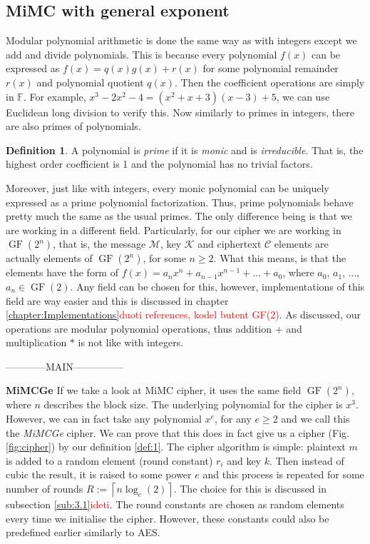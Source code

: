 \documentclass{Resources/UoBLab1}
\theoremstyle{definition}
\newtheorem{definition}[theorem]{Definition}
\begin{document}
\subsection{MiMC with general exponent}
Modular polynomial arithmetic is done the same way as with integers except we add and divide polynomials. This is because every polynomial $f(x)$ can be expressed as $f(x) = q(x)g(x) + r(x)$ for some polynomial remainder $r(x)$ and polynomial quotient $q(x)$. Then the coefficient operations are simply in $\mathbb{F}$. For example, \(x^3-2x^2-4 = (x^2+x+3)(x-3) + 5\), we can use Euclidean long division to verify this. Now similarly to primes in integers, there are also primes of polynomials.
\begin{definition}
    A polynomial is \textit{prime} if it is \textit{monic} and is \textit{irreducible}. That is, the highest order coefficient is 1 and the polynomial has no trivial factors.
\end{definition}
Moreover, just like with integers, every monic polynomial can be uniquely expressed as a prime polynomial factorization. Thus, prime polynomials behave pretty much the same as the usual primes. The only difference being is that we are working in a different field. Particularly, for our cipher we are working in $\operatorname{GF}(2^n)$, that is, the message $\mathcal{M}$, key $\mathcal{K}$ and ciphertext $\mathcal{C}$ elements are actually elements of $\operatorname{GF}(2^n)$, for some $n \ge 2$. What this means, is that the elements have the form of $f(x) = a_nx^n + a_{n-1}x^{n-1} + ... + a_0$, where $a_0$, $a_1$, ..., $a_n \in \operatorname{GF}(2)$. Any field can be chosen for this, however, implementations of this field are way easier and this is discussed in chapter \ref{chapter:Implementations}\textcolor{red}{duoti references, kodel butent GF(2)}. As discussed, our operations are modular polynomial operations, thus addition $+$ and multiplication $*$ is not like with integers.\medskip

------------MAIN---------------

\noindent\textbf{MiMCGe} If we take a look at MiMC cipher\cite{MiMC}, it uses the same field $\operatorname{GF}(2^n)$, where $n$ describes the block size. The underlying polynomial for the cipher is $x^3$. However, we can in fact take any polynomial $x^e$, for any $e \ge 2$ and we call this the \textit{MiMCGe} cipher. We can prove that this does in fact give us a cipher (Fig. \ref{fig:cipher}) by our definition \ref{def:1}. The cipher algorithm is simple: plaintext $m$ is added to a random element (round constant) $r_i$ and key $k$. Then instead of cubic the result, it is raised to some power $e$ and this process is repeated for some number of rounds $R := \left\lceil n\log_e(2) \right\rceil$. The choice for this is discussed in subsection \ref{sub:3.1}\textcolor{red}{ideti}. The round constants are chosen as random elements every time we initialise the cipher. However, these constants could also be predefined earlier similarly to AES.
\end{document}
